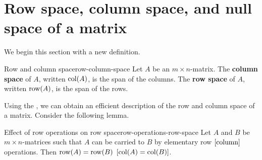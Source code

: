 \section{Row space, column space, and null space of a matrix}

We begin this section with a new definition.

\begin{definition}{Row and column space}{row-column-space}
  Let $A$ be an $m\times n$-matrix. The \textbf{column
    space} of $A$,
  written $\mbox{\rm col}(A)$, is the span of the columns. The \textbf{row
    space} of $A$, written
  $\mbox{\rm row}(A)$, is the span of the rows.
\end{definition}

Using the {\rref}, we can obtain an efficient description of the row
and column space of a matrix. Consider the following lemma.

\begin{lemma}{Effect of row operations on row space}{row-operations-row-space}
  Let $A$ and $B$ be $m\times n$-matrices such that $A$ can be carried
  to $B$ by elementary row $\left[\mbox{column}\right]$ operations. Then
  $\row(A)=\row(B)$ $\mat{\col(A)=\col(B)}$.
\end{lemma}

